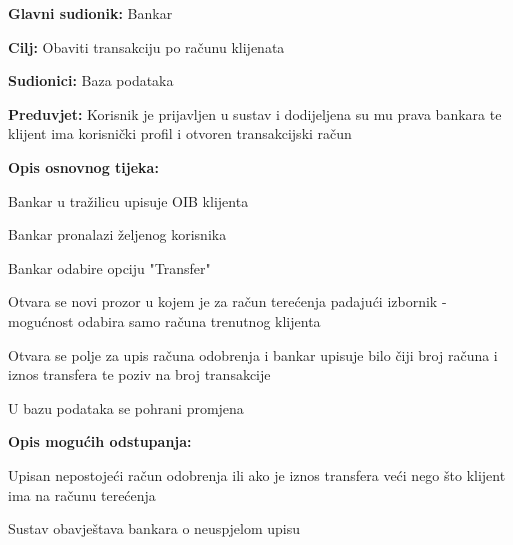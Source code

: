 	            \noindent {}
	            \begin{packed_item}
	            	
	            	\item \textbf{Glavni sudionik: }Bankar
	            	\item  \textbf{Cilj:} Obaviti transakciju po računu klijenata
	            	\item  \textbf{Sudionici:} Baza podataka
	            	\item  \textbf{Preduvjet:} Korisnik je prijavljen u sustav i dodijeljena su mu prava bankara te klijent ima korisnički profil i otvoren transakcijski račun
	            	\item  \textbf{Opis osnovnog tijeka:}
	            	
	            	\item[] \begin{packed_enum}
	            		
	            		\item Bankar u tražilicu upisuje OIB klijenta
	            		\item Bankar pronalazi željenog korisnika
	            		\item Bankar odabire opciju "Transfer"
	            		\item Otvara se novi prozor u kojem je za račun terećenja padajući izbornik - mogućnost odabira samo računa trenutnog klijenta
	            		\item Otvara se polje za upis računa odobrenja i bankar upisuje bilo čiji broj računa i iznos transfera te poziv na broj transakcije
	            		\item U bazu podataka se pohrani promjena 
	            	\end{packed_enum}
	            	
	            	\item  \textbf{Opis mogućih odstupanja:} 
	            	
	            	\item[] \begin{packed_item}
	            		
	            		\item[3.a] Upisan nepostojeći račun  odobrenja ili ako je iznos transfera veći nego što klijent ima na računu terećenja
	            		\item[] \begin{packed_enum}
	            			
	            			\item Sustav obavještava bankara o neuspjelom upisu 
	            			
	            		\end{packed_enum}
	            		
	            	\end{packed_item}
	            \end{packed_item}
                            
